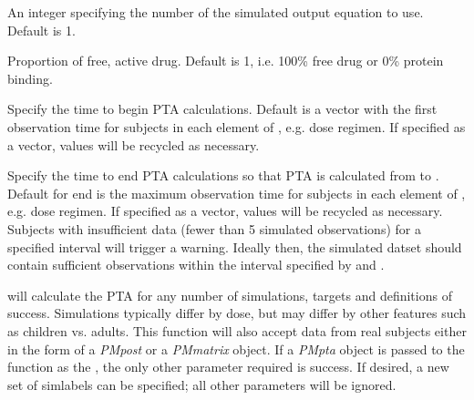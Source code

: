 \documentclass[a4paper]{book}
\begin{document}
\begin{Arguments}
\begin{ldescription}
\item[\code{outeq}] An integer specifying the number of the simulated output equation to use. Default is 1.

\item[\code{free.fraction}] Proportion of free, active drug.  Default is 1, i.e. 100\% free drug or 0\% protein binding.

\item[\code{start}] Specify the time to begin PTA calculations. Default is a vector with the first observation time for subjects
in each element of , e.g. dose regimen. If specified as a vector, values will be recycled as necessary.

\item[\code{end}] Specify the time to end PTA calculations so that PTA is calculated
from  to .  Default for end is the maximum observation
time for subjects in each element of , e.g. dose regimen.  If specified as a vector, values will be recycled
as necessary. Subjects with insufficient data (fewer than 5 simulated observations) for a specified interval will trigger a warning.
Ideally then, the simulated datset should contain sufficient observations within the interval specified by  and .
\end{ldescription}
\end{Arguments}
%
\begin{Details}\relax
{} will calculate the PTA for any number of simulations, targets and definitions of success.
Simulations typically differ by dose, but may differ by other features such as children vs. adults. This function will also
accept data from real subjects either in the form of a \emph{PMpost} or a \emph{PMmatrix} object.
If a \emph{PMpta} object is passed to the function as the , the only other parameter required is success. 
If desired, a new set of simlabels can be specified; all other parameters will be ignored.
\end{Details}
%
\end{document}
